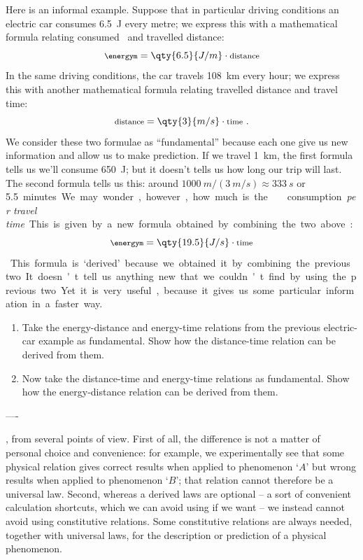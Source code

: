 Here is an informal example. Suppose that in particular driving conditions an electric car consumes \qty{6.5}{J} every metre; we express this with a mathematical formula relating consumed \energym\ and travelled distance:
\begin{equation*}
  \text{\footnotesize \energym} = \qty{6.5}{J/m} \cdot \text{\footnotesize distance}
\end{equation*}
In the same driving conditions, the car travels \qty{108}{km} every hour; we express this with another mathematical formula relating travelled distance and travel time:
\begin{equation*}
  \text{\footnotesize distance} = \qty{3}{m/s} \cdot \text{\footnotesize time} \ .
\end{equation*}
We consider these two formulae as \enquote{fundamental} because each one give us new information and allow us to make prediction. If we travel \qty{1}{km}, the first formula tells us we'll consume \qty{650}{J}; but it doesn't tells us how long our trip will last. The second formula tells us this: around $\qty{1000}{m}/(\qty{3}{m/s}) \approx \qty{333}{s}$ or \qty{5.5} minutes. We may wonder, however, how much is the \energym\ consumption \emph{per travel time}. This is given by a new formula obtained by combining the two above:
\begin{equation*}
  \text{\footnotesize \energym} = \qty{19.5}{J/s}\cdot \text{\footnotesize time}
\end{equation*}
This formula is \enquote*{derived} because we obtained it by combining the previous two. It doesn't tell us anything new that we couldn't find by using the previous two. Yet it is very useful, because it gives us some particular information in a faster way.

\begin{exercise}
  \begin{enumerate}[exerc]
  \item Take the energy-distance and energy-time relations from the previous electric-car example as fundamental. Show how the distance-time relation can be derived from them.
  \item Now take the distance-time and energy-time relations as fundamental. Show how the energy-distance relation can be derived from them.
  \end{enumerate}
\end{exercise}

----

, from several points of view. First of all, the difference is not a matter of personal choice and convenience: for example, we experimentally see that some physical relation gives correct results when applied to phenomenon \enquote*{$A$} but wrong results when applied to phenomenon \enquote*{$B$}; that relation cannot therefore be a universal law. Second, whereas a derived laws are optional -- a sort of convenient calculation shortcuts, which we can avoid using if we want -- we instead cannot avoid using constitutive relations. Some constitutive relations are always needed, together with universal laws, for the description or prediction of a physical phenomenon.


